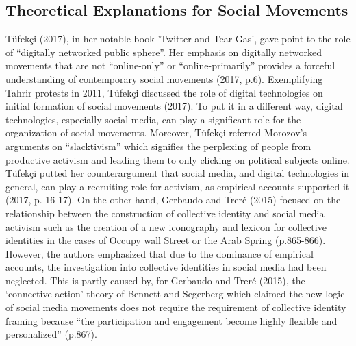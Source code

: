 \documentclass[a4paper]{article}
\begin{document}
\subsection*{Theoretical Explanations for Social Movements}
	
Tüfekçi (2017), in her notable book 'Twitter and Tear Gas', gave point to the role of “digitally networked public sphere”. Her emphasis on digitally networked movements that are not “online-only” or “online-primarily” provides a forceful understanding of contemporary social movements (2017, p.6). Exemplifying Tahrir protests in 2011, Tüfekçi discussed the role of digital technologies on initial formation of social movements (2017). To put it in a different way, digital technologies, especially social media, can play a significant role for the organization of social movements. Moreover, Tüfekçi referred Morozov’s arguments on “slacktivism” which signifies the perplexing of people from productive activism and leading them to only clicking on political subjects online. Tüfekçi putted her counterargument that social media, and digital technologies in general, can play a recruiting role for activism, as empirical accounts supported it (2017, p. 16-17). On the other hand, Gerbaudo and Treré (2015) focused on the relationship between the construction of collective identity and social media activism such as the creation of a new iconography and lexicon for collective identities in the cases of Occupy wall Street or the Arab Spring (p.865-866). However, the authors emphasized that due to the dominance of empirical accounts, the investigation into collective identities in social media had been neglected. This is partly caused by, for Gerbaudo and Treré (2015), the ‘connective action’ theory of Bennett and Segerberg which claimed the new logic of social media movements does not require the requirement of collective identity framing because “the participation and engagement become highly flexible and personalized” (p.867). \\
	
\end{document}
